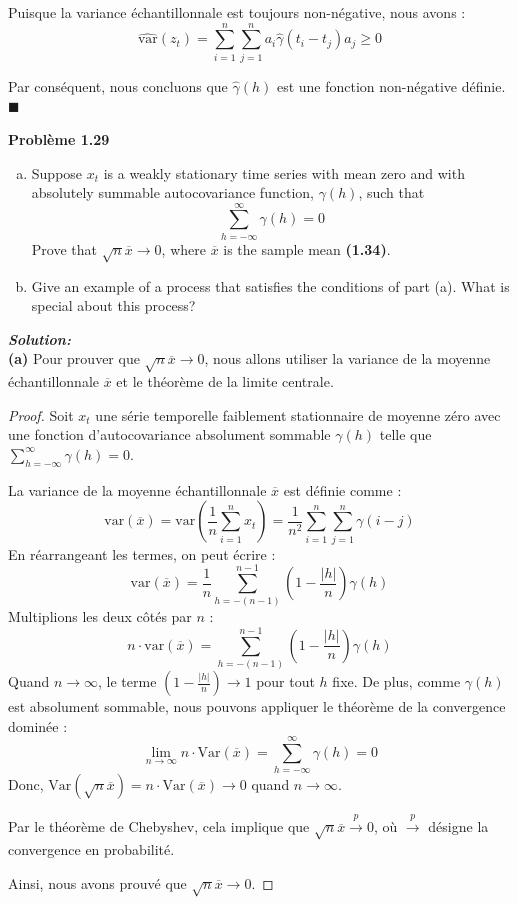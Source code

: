 \documentclass{homework}
\begin{document}
Puisque la variance échantillonnale est toujours non-négative, nous avons :
   \[ \widehat{\text{var}}(z_t) = \sum_{i=1}^n \sum_{j=1}^n a_i \hat{\gamma}(t_i - t_j) a_j \geq 0 \]

Par conséquent, nous concluons que $\hat{\gamma}(h)$ est une fonction non-négative définie. $\blacksquare$

\newpage
\textbf{\Large{Problème 1.29}}

\begin{enumerate}[(a)]
    \item Suppose $x_t$ is a weakly stationary time series with mean zero and with absolutely summable autocovariance function, $\gamma(h)$, such that
    $$\sum_{h=-\infty}^{\infty} \gamma(h) = 0$$
    Prove that $\sqrt{n} \overline{x} \to 0$, where $\overline{x}$ is the sample mean \textbf{(1.34)}.
    \item Give an example of a process that satisfies the conditions of part (a). What is special about this process?
\end{enumerate}

\textit{\textbf{Solution:}}\\
\textbf{(a)} Pour prouver que $\sqrt{n} \overline{x} \to 0$, nous allons utiliser la variance de la moyenne échantillonnale $\overline{x}$ et le théorème de la limite centrale.

\begin{proof}
Soit $x_t$ une série temporelle faiblement stationnaire de moyenne zéro avec une fonction d'autocovariance absolument sommable $\gamma(h)$ telle que $\sum_{h=-\infty}^{\infty} \gamma(h) = 0$.

La variance de la moyenne échantillonnale $\overline{x}$ est définie comme :
\[ \text{var}(\overline{x}) = \text{var}\left(\frac{1}{n}\sum_{i=1}^n x_t\right) = \frac{1}{n^2} \sum_{i=1}^n \sum_{j=1}^n \gamma(i-j) \]
En réarrangeant les termes, on peut écrire :
   \[ \text{var}(\overline{x}) = \frac{1}{n} \sum_{h=-(n-1)}^{n-1} (1-\frac{|h|}{n}) \gamma(h) \]
Multiplions les deux côtés par $n$ :
   \[ n \cdot \text{var}(\overline{x}) = \sum_{h=-(n-1)}^{n-1} (1-\frac{|h|}{n}) \gamma(h) \]
Quand $n \to \infty$, le terme $(1-\frac{|h|}{n}) \to 1$ pour tout $h$ fixe. De plus, comme $\gamma(h)$ est absolument sommable, nous pouvons appliquer le théorème de la convergence dominée :
   \[ \lim_{n \to \infty} n \cdot \text{Var}(\overline{x}) = \sum_{h=-\infty}^{\infty} \gamma(h) = 0 \]
Donc, $\text{Var}(\sqrt{n} \overline{x}) = n \cdot \text{Var}(\overline{x}) \to 0$ quand $n \to \infty$.

Par le théorème de Chebyshev, cela implique que $\sqrt{n} \overline{x} \xrightarrow{p} 0$, où $\xrightarrow{p}$ désigne la convergence en probabilité.

Ainsi, nous avons prouvé que $\sqrt{n} \overline{x} \to 0$.
\end{proof}
\end{document}

